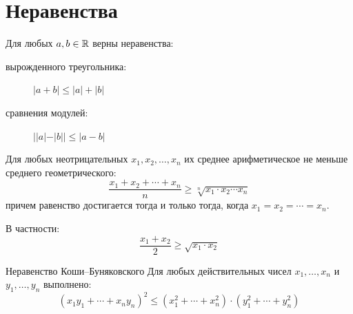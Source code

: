 \section{Неравенства}

Для любых $a, b \in \mathbb{R}$ верны неравенства:
\begin{description}
    \item[вырожденного треугольника:] $|a + b| \le |a| + |b|$
    \item[сравнения модулей:] $||a| - |b|| \le |a - b|$
\end{description}

Для любых неотрицательных $x_1, x_2, \dots, x_n$
их среднее арифметическое не меньше среднего геометрического:
\[
    \frac{x_1 + x_2 + \cdots + x_n}{n} \ge \sqrt[n]{x_1 \cdot x_2 \cdots x_n}
\]
причем равенство достигается тогда и только тогда, когда $x_1 = x_2 = \cdots = x_n$.

В частности:
\[
    \frac{x_1 + x_2}{2} \ge \sqrt{x_1 \cdot x_2}
\]

\begin{theorem}{Неравенство Коши--Буняковского}{}
    Для любых действительных чисел $x_1, \dots, x_n$ и $y_1, \dots, y_n$ выполнено:
    \[
        (x_1 y_1 + \cdots + x_n y_n)^2 \le (x_1^2 + \cdots + x_n^2) \cdot (y_1^2 + \cdots + y_n^2)
    \]
\end{theorem}
